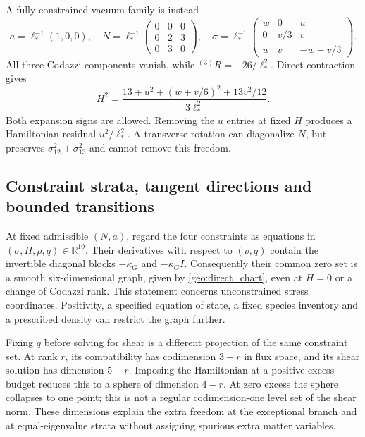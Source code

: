 A fully constrained vacuum family is instead
\begin{equation}
 a=\ell_*^{-1}(1,0,0),\quad
 N=\ell_*^{-1}\begin{pmatrix}0&0&0\\0&2&3\\0&3&0\end{pmatrix},\quad
 \sigma=\ell_*^{-1}\begin{pmatrix}w&0&u\\0&v/3&v\\u&v&-w-v/3\end{pmatrix}.
 \label{geo:exceptional_vacuum}
\end{equation}
All three Codazzi components vanish, while ${}^{(3)}R=-26/\ell_*^2$. Direct contraction gives
\begin{equation}
 H^2=\frac{13+u^2+(w+v/6)^2+13v^2/12}{3\ell_*^2}.
 \label{geo:exceptional_vacuum_H}
\end{equation}
Both expansion signs are allowed. Removing the $u$ entries at fixed $H$ produces a Hamiltonian residual $u^2/\ell_*^2$. A transverse rotation can diagonalize $N$, but preserves $\sigma_{12}^2+\sigma_{13}^2$ and cannot remove this freedom.

\subsection{Constraint strata, tangent directions and bounded transitions}
\label{geo:strata}
At fixed admissible $(N,a)$, regard the four constraints as equations in $(\sigma,H,\rho,q)\in\mathbb R^{10}$. Their derivatives with respect to $(\rho,q)$ contain the invertible diagonal blocks $-\kappa_G$ and $-\kappa_GI$. Consequently their common zero set is a smooth six-dimensional graph, given by \eqref{geo:direct_chart}, even at $H=0$ or a change of Codazzi rank. This statement concerns unconstrained stress coordinates. Positivity, a specified equation of state, a fixed species inventory and a prescribed density can restrict the graph further.

Fixing $q$ before solving for shear is a different projection of the same constraint set. At rank $r$, its compatibility has codimension $3-r$ in flux space, and its shear solution has dimension $5-r$. Imposing the Hamiltonian at a positive excess budget reduces this to a sphere of dimension $4-r$. At zero excess the sphere collapses to one point; this is not a regular codimension-one level set of the shear norm. These dimensions explain the extra freedom at the exceptional branch and at equal-eigenvalue strata without assigning spurious extra matter variables.

